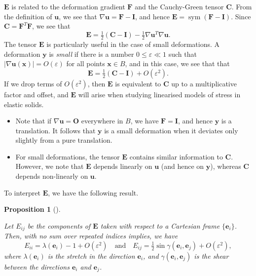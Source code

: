 \documentclass[
  letterpaper,
  DIV=11,
  numbers=noendperiod]{scrreprt}
\theoremstyle{plain}
\newtheorem{proposition}{Proposition}[chapter]
\theoremstyle{remark}
\begin{document}
\({\boldsymbol{E}}\) is related to the deformation gradient
\({\boldsymbol{F}}\) and the Cauchy-Green tensor \({\boldsymbol{C}}\).
From the definition of \({\boldsymbol{u}}\), we see that
\(\nabla {\boldsymbol{u}}= {\boldsymbol{F}}-{\boldsymbol{I}}\), and
hence
\({\boldsymbol{E}}= {\operatorname{sym}}({\boldsymbol{F}}-{\boldsymbol{I}})\).
Since \({\boldsymbol{C}}= {\boldsymbol{F}}^T{\boldsymbol{F}}\), we see
that
\[{\boldsymbol{E}}= \tfrac12({\boldsymbol{C}}-{\boldsymbol{I}})-\tfrac12\nabla{\boldsymbol{u}}^T\nabla {\boldsymbol{u}}.\]
The tensor \({\boldsymbol{E}}\) is particularly useful in the case of
small deformations. A deformation \({\boldsymbol{y}}\) is \emph{small}
if there is a number \(0\leq \varepsilon\ll 1\) such that
\(|\nabla{\boldsymbol{u}}({\boldsymbol{x}})| = {O}(\varepsilon)\) for
all points \({\boldsymbol{x}}\in B\), and in this case, we see that that
\[{\boldsymbol{E}}= \tfrac12({\boldsymbol{C}}-{\boldsymbol{I}})+{O}(\varepsilon^2).\]
If we drop terms of \({O}(\varepsilon^2)\), then \({\boldsymbol{E}}\) is
equivalent to \({\boldsymbol{C}}\) up to a multiplicative factor and
offset, and \({\boldsymbol{E}}\) will arise when studying linearised
models of stress in elastic solids.

\begin{itemize}
\item
  Note that if \(\nabla {\boldsymbol{u}}={\boldsymbol{O}}\) everywhere
  in \(B\), we have \({\boldsymbol{F}}= {\boldsymbol{I}}\), and hence
  \({\boldsymbol{y}}\) is a translation. It follows that
  \({\boldsymbol{y}}\) is a small deformation when it deviates only
  slightly from a pure translation.
\item
  For small deformations, the tensor \({\boldsymbol{E}}\) contains
  similar information to \({\boldsymbol{C}}\). However, we note that
  \({\boldsymbol{E}}\) depends linearly on \({\boldsymbol{u}}\) (and
  hence on \({\boldsymbol{y}}\)), whereas \({\boldsymbol{C}}\) depends
  non-linearly on \({\boldsymbol{u}}\).
\end{itemize}

To interpret \({\boldsymbol{E}}\), we have the following result.

\begin{proposition}[]\protect\hypertarget{prp-Ecomponents}{}\label{prp-Ecomponents}

Let \(E_{ij}\) be the components of \({\boldsymbol{E}}\) taken with
respect to a Cartesian frame \(\{{\boldsymbol{e}}_i\}\). Then, with no
sum over repeated indices implies, we have
\[E_{ii} =\lambda({\boldsymbol{e}}_i)-1+{O}(\varepsilon^2)\quad\text{and}\quad
    E_{ij} =\tfrac12\sin\gamma({\boldsymbol{e}}_i,{\boldsymbol{e}}_j)+{O}(\varepsilon^2),\]
where \(\lambda({\boldsymbol{e}}_i)\) is the stretch in the direction
\({\boldsymbol{e}}_i\), and
\(\gamma({\boldsymbol{e}}_i,{\boldsymbol{e}}_j)\) is the shear between
the directions \({\boldsymbol{e}}_i\) and \({\boldsymbol{e}}_j\).

\end{proposition}
\end{document}
